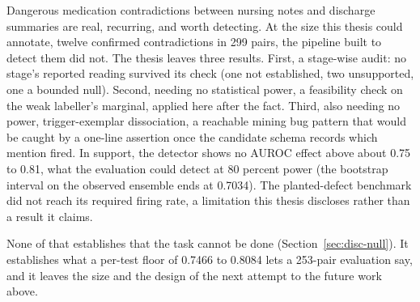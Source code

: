 Dangerous medication contradictions between nursing notes and discharge
summaries are real, recurring, and worth detecting. At the size this thesis
could annotate, twelve confirmed contradictions in 299 pairs, the pipeline
built to detect them did not. The thesis leaves three results. First, a stage-wise
audit: no stage's reported reading survived its check (one not established, two
unsupported, one a bounded null). Second, needing no statistical power, a feasibility
check on the weak labeller's marginal, applied here after the fact. Third, also needing
no power, trigger-exemplar dissociation, a reachable mining bug pattern that
would be caught by a one-line assertion once the candidate schema records
which mention fired. In support, the detector shows no AUROC effect above
about 0.75 to 0.81, what the evaluation could detect at 80 percent power
(the bootstrap interval on the observed ensemble ends at 0.7034). The planted-defect
benchmark did not reach its required firing rate, a limitation this thesis
discloses rather than a result it claims.

None of that establishes that the task cannot be done
(Section~\ref{sec:disc-null}). It establishes what a per-test floor of 0.7466
to 0.8084 lets a 253-pair evaluation say, and it leaves the size and the
design of the next attempt to the future work above.
